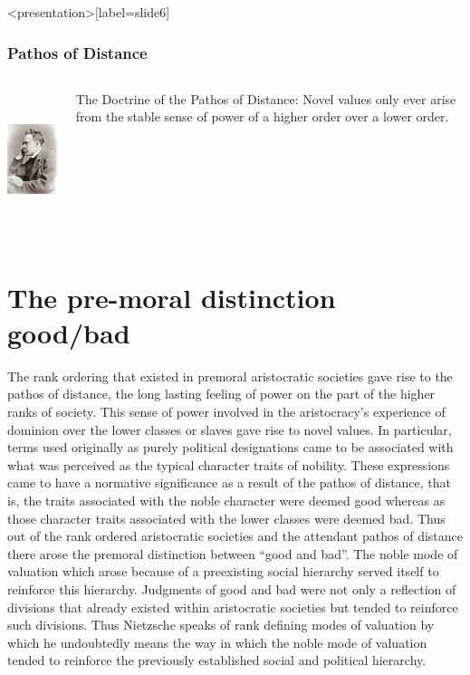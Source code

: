 \begin{frame}<presentation>[label=slide6]
    \frametitle{Pathos of Distance}
        \begin{columns}
            \begin{column}{3cm}
                \includegraphics[height=4cm]{../../../graphics/nietzsche.jpg}
            \end{column}
            \begin{column}{7cm}
                \alert{The Doctrine of the Pathos of Distance}: Novel values only ever arise from the stable sense of power of a higher order over a lower order.
            \end{column}
        \end{columns}
\end{frame}


\section{The pre-moral distinction good/bad}\label{sec:the_pre_moral_distinction_good_bad} %

The rank ordering that existed in premoral aristocratic societies gave rise to the pathos of distance, the long lasting feeling of power on the part of the higher ranks of society. This sense of power involved in the aristocracy's experience of dominion over the lower classes or slaves gave rise to novel values. In particular, terms used originally as purely political designations came to be associated with what was perceived as the typical character traits of nobility. These expressions came to have a normative significance as a result of the pathos of distance, that is, the traits associated with the noble character were deemed good whereas as those character traits associated with the lower classes were deemed bad. Thus out of the rank ordered aristocratic societies and the attendant pathos of distance there arose the premoral distinction between ``good and bad''. The noble mode of valuation which arose because of a preexisting social hierarchy served itself to reinforce this hierarchy. Judgments of good and bad were not only a reflection of divisions that already existed within aristocratic societies but tended to reinforce such divisions. Thus Nietzsche speaks of rank defining modes of valuation by which he undoubtedly means the way in which the noble mode of valuation tended to reinforce the previously established social and political hierarchy.

